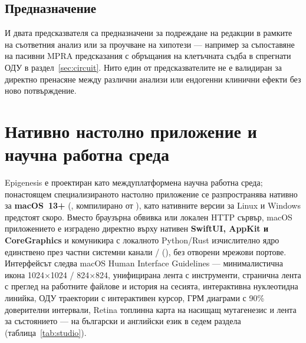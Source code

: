 \documentclass[10.5pt,a4paper]{article}
\begin{document}
\subsection{Предназначение}

И двата предсказвателя са предназначени за подреждане на редакции в рамките на съответния анализ или за проучване на хипотези — например за съпоставяне на пасивни MPRA предсказания с обръщания на клетъчната съдба в спрегнати ОДУ в раздел~\ref{sec:circuit}. Нито един от предсказвателите не е валидиран за директно пренасяне между различни анализи или ендогенни клинични ефекти без ново потвърждение.

\section{Нативно настолно приложение и научна работна среда}\label{sec:studio}

Epigenesis е проектиран като междуплатформена научна работна среда; понастоящем специализираното настолно приложение се разпространява нативно за \textbf{macOS~13+} (, компилирано от ), като нативните версии за Linux и Windows предстоят скоро\texttrademark. Вместо браузърна обвивка или локален  HTTP сървър, macOS приложението е изградено директно върху нативен \textbf{SwiftUI, AppKit и CoreGraphics} и комуникира с локалното Python/Rust изчислително ядро единствено през частни системни канали / (), без отворени мрежови портове. Интерфейсът следва macOS Human Interface Guidelines — минималистична икона 1024$\times$1024 / 824$\times$824, унифицирана лента с инструменти, странична лента  с преглед на работните файлове и история на сесията, интерактивна нуклеотидна линийка, ОДУ траектории с интерактивен курсор, ГРМ диаграми с 90\% доверителни интервали, Retina топлинна карта на насищащ мутагенезис и лента за състоянието — на български и английски език в седем раздела (таблица~\ref{tab:studio}).
\end{document}
